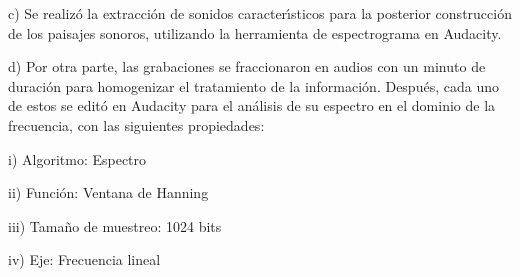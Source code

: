 \qquad c) Se realiz\'{o} la extracci\'{o}n de sonidos caracter\'{\i}sticos
para la posterior construcci\'{o}n de los paisajes sonoros, utilizando la
herramienta de espectrograma en Audacity.

\qquad d) Por otra parte, las grabaciones se fraccionaron en audios con un
minuto de duraci\'{o}n para homogenizar el tratamiento de la informaci\'{o}n.
Despu\'{e}s, cada uno de estos se edit\'{o} en Audacity para el an\'{a}lisis
de su espectro en el dominio de la frecuencia, con las siguientes propiedades:

\qquad\qquad i) Algoritmo: Espectro

\qquad\qquad ii) Funci\'{o}n: Ventana de Hanning

\qquad\qquad iii) Tama\~{n}o de muestreo: 1024 bits

\qquad\qquad iv) Eje: Frecuencia lineal

